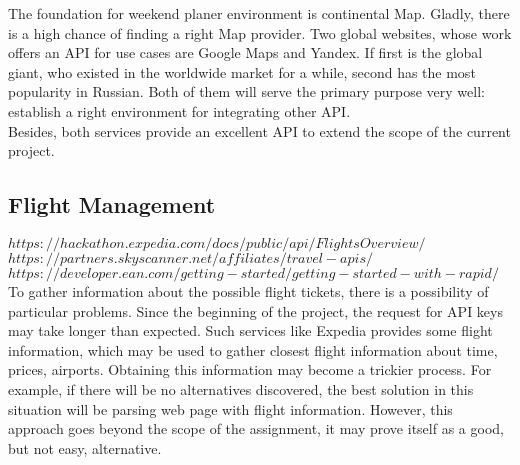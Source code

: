 \documentclass[12pt]{article}
\numberwithin{equation}{section} %
\numberwithin{figure}{section} %
\numberwithin{table}{section} %
\begin{document}
		The foundation for weekend planer environment is continental Map. Gladly, there is a high chance of finding a right Map provider. Two global websites, whose work offers an API for use cases are Google Maps and Yandex. If first is the global giant, who existed in the worldwide market for a while, second has the most popularity in Russian. Both of them will serve the primary purpose very well: establish a right environment for integrating other API. \\
		Besides, both services provide an excellent API to extend the scope of the current project. \\
	
%
	\subsection{Flight Management}
		$ https://hackathon.expedia.com/docs/public/api/Flights Overview/ $ \\
		$ https://partners.skyscanner.net/affiliates/travel-apis/ $ \\
		$ https://developer.ean.com/getting-started/getting-started-with-rapid/ $ \\
		
		To gather information about the possible flight tickets, there is a possibility of particular problems. Since the beginning of the project, the request for API keys may take longer than expected. Such services like Expedia provides some flight information, which may be used to gather closest flight information about time, prices, airports. Obtaining this information may become a trickier process. For example, if there will be no alternatives discovered, the best solution in this situation will be parsing web page with flight information. However, this approach goes beyond the scope of the assignment, it may prove itself as a good, but not easy, alternative.\\
\end{document}
